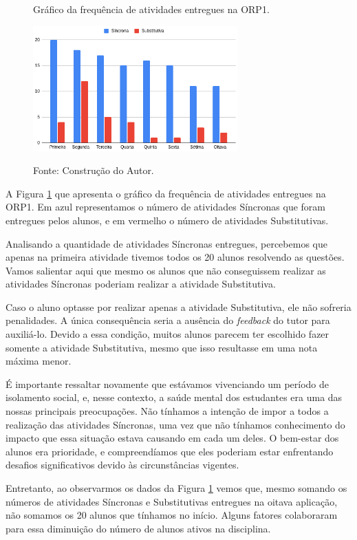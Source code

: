 \begin{figure}[ht]
\begin{center}
\caption{Gráfico da frequência de atividades entregues na ORP1.}
\includegraphics[width=0.7\textwidth]{fig/numerodeatividadesrealizadasORP1.png}
\label{fig:ativsORP1}
\caption*{Fonte: Construção do Autor.}
\end{center}
\end{figure}

A Figura \ref{fig:ativsORP1} que apresenta o gráfico da frequência de atividades entregues na ORP1. Em azul representamos o número de atividades Síncronas que foram entregues pelos alunos, e em vermelho o número de atividades Substitutivas.

Analisando a quantidade de atividades Síncronas entregues, percebemos que apenas na primeira atividade tivemos todos os 20 alunos resolvendo as questões. Vamos salientar aqui que mesmo os alunos que não conseguissem realizar as atividades Síncronas poderiam realizar a atividade Substitutiva.

Caso o aluno optasse por realizar apenas a atividade Substitutiva, ele não sofreria penalidades. A única consequência seria a ausência do \textit{feedback} do tutor para auxiliá-lo. Devido a essa condição, muitos alunos parecem ter escolhido fazer somente a atividade Substitutiva, mesmo que isso resultasse em uma nota máxima menor.

É importante ressaltar novamente que estávamos vivenciando um período de isolamento social, e, nesse contexto, a saúde mental dos estudantes era uma das nossas principais preocupações. Não tínhamos a intenção de impor a todos a realização das atividades Síncronas, uma vez que não tínhamos conhecimento do impacto que essa situação estava causando em cada um deles. O bem-estar dos alunos era prioridade, e compreendíamos que eles poderiam estar enfrentando desafios significativos devido às circunstâncias vigentes.

Entretanto, ao observarmos os dados da Figura \ref{fig:ativsORP1} vemos que, mesmo somando os números de atividades Síncronas e Substitutivas entregues na oitava aplicação, não somamos os 20 alunos que tínhamos no início. Alguns fatores colaboraram para essa diminuição do número de alunos ativos na disciplina.

